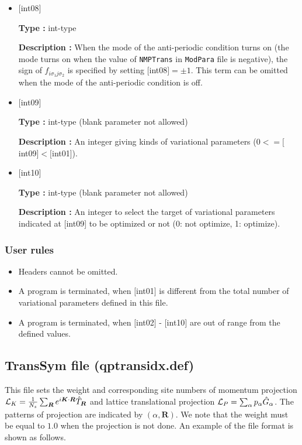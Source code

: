 \begin{itemize}
  {\bf Description :} An integer setting kinds of variational  parameters ($0<= [$int07$]<[$int01]). 

 \item  $[$int08$]$
   
   {\bf Type :} int-type

  {\bf Description :} When the mode of the anti-periodic condition turns on (the mode turns on when the value of \verb|NMPTrans| in \verb|ModPara| file is negative), the sign of $f_{i\sigma_1j\sigma_2}$ is specified by setting $[$int08$]=\pm1$. This term can be omitted when the mode of the anti-periodic condition is off.

 \item  $[$int09$]$
   
   {\bf Type :} int-type (blank parameter not allowed)

  {\bf Description :} An integer giving kinds of variational  parameters ($0<= [$int09$]<[$int01]).   
 \item  $[$int10$]$
   
   {\bf Type :} int-type (blank parameter not allowed)

  {\bf Description :} An integer to select the target of variational parameters indicated at [int09] to be optimized or not (0: not optimize, 1: optimize).
  
  
\end{itemize}

\subsubsection{User rules}
\begin{itemize}
\item Headers cannot be omitted. 
\item A program is terminated, when $[$int01$]$ is different from the total number of variational parameters defined in this file.
\item A program is terminated, when $[$int02$]$ - $[$int10$]$ are out of range from the defined values.
\end{itemize}


\newpage
\subsection{TransSym file (qptransidx.def)}
\label{Subsec:TransSym}
This file sets the weight and corresponding site numbers of momentum projection
${\cal L}_K=\frac{1}{N_s}\sum_{{\bm R}}e^{i {\bm K} \cdot{\bm R} } \hat{T}_{\bm R}$
and lattice translational projection 
${\cal L}_P=\sum_{\alpha}p_{\alpha} \hat{G}_{\alpha}$. 
The patterns of projection are indicated by $(\alpha, {\bm R})$.
We note that the weight must be equal to $1.0$ when the projection is not done.
An example of the file format is shown as follows.

